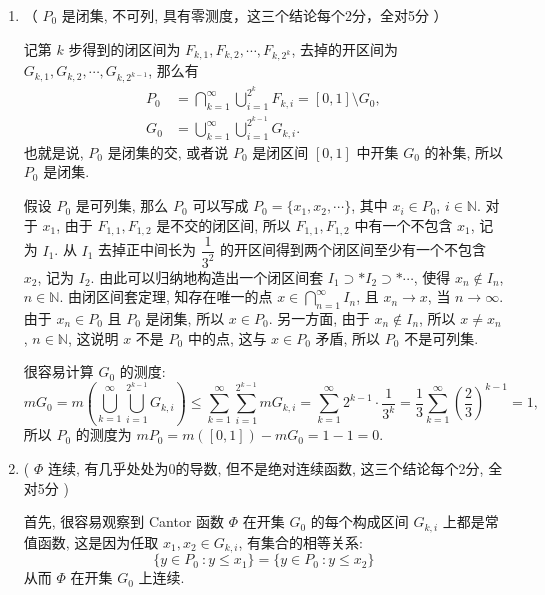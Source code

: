 \begin{solution}
  \begin{enumerate}
    \item （ \(P_0\) 是闭集, 不可列, 具有零测度，这三个结论每个2分，全对5分 ）

    记第 \(k\) 步得到的闭区间为 \(F_{k, 1}, F_{k, 2}, \cdots, F_{k, 2^k}\), 去掉的开区间为 \(G_{k, 1}, G_{k, 2}, \cdots, G_{k, 2^{k-1}}\), 那么有
    \[\begin{aligned}
    P_0 & = \bigcap\limits_{k=1}^{\infty} \bigcup\limits_{i=1}^{2^k} F_{k, i} = [0, 1] \setminus G_0, \\
    G_0 & = \bigcup\limits_{k=1}^{\infty} \bigcup\limits_{i=1}^{2^{k-1}} G_{k, i}.
    \end{aligned}\]
    也就是说, \(P_0\) 是闭集的交, 或者说 \(P_0\) 是闭区间 \([0, 1]\) 中开集 \(G_0\) 的补集, 所以 \(P_0\) 是闭集.

    假设 \(P_0\) 是可列集, 那么 \(P_0\) 可以写成 \(P_0 = \{ x_1, x_2, \cdots \}\), 其中 \(x_i \in P_0\), \(i \in \mathbb{N}\). 对于 \(x_1\), 由于 \(F_{1, 1}, F_{1, 2}\) 是不交的闭区间, 所以 \(F_{1, 1}, F_{1, 2}\) 中有一个不包含 \(x_1\), 记为 \(I_1\). 从 \(I_1\) 去掉正中间长为 \(\dfrac{1}{3^2}\) 的开区间得到两个闭区间至少有一个不包含 \(x_2\), 记为 \(I_2\). 由此可以归纳地构造出一个闭区间套 \(I_1 \supset* I_2 \supset* \cdots\), 使得 \(x_n \notin I_n\), \(n \in \mathbb{N}\). 由闭区间套定理, 知存在唯一的点 \(x \in \bigcap\limits_{n=1}^{\infty} I_n\), 且 \(x_n \to x\), 当 \(n \to \infty\). 由于 \(x_n \in P_0\) 且 \(P_0\) 是闭集, 所以 \(x \in P_0\). 另一方面, 由于 \(x_n \notin I_n\), 所以 \(x \neq x_n\), \(n \in \mathbb{N}\), 这说明 \(x\) 不是 \(P_0\) 中的点, 这与 \(x \in P_0\) 矛盾, 所以 \(P_0\) 不是可列集.

    很容易计算 \(G_0\) 的测度:
    \[m G_0 = m \left( \bigcup\limits_{k=1}^{\infty} \bigcup\limits_{i=1}^{2^{k-1}} G_{k, i} \right) \leqslant \sum\limits_{k=1}^{\infty} \sum\limits_{i=1}^{2^{k-1}} m G_{k, i} = \sum\limits_{k=1}^{\infty} 2^{k-1} \cdot \dfrac{1}{3^k} = \dfrac{1}{3} \sum\limits_{k=1}^{\infty} \left( \dfrac{2}{3} \right)^{k-1} = 1,\]
    所以 \(P_0\) 的测度为 \(m P_0 = m ([0, 1]) - m G_0 = 1 - 1 = 0\).
    \item ( \(\Phi\) 连续, 有几乎处处为0的导数, 但不是绝对连续函数, 这三个结论每个2分, 全对5分 )  

    首先, 很容易观察到 Cantor 函数 \(\Phi\) 在开集 \(G_0\) 的每个构成区间 \(G_{k, i}\) 上都是常值函数, 这是因为任取 \(x_1, x_2 \in G_{k, i}\), 有集合的相等关系:
    \[\{y \in P_0 ~ \colon y \leqslant x_1\} = \{y \in P_0 ~ \colon y \leqslant x_2\}\]
    从而 \(\Phi\) 在开集 \(G_0\) 上连续.


\end{enumerate}
\end{solution}
